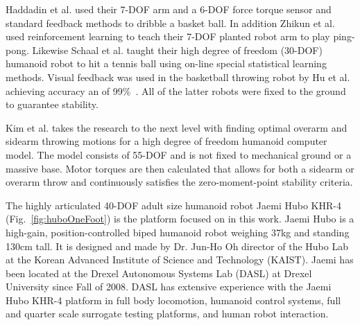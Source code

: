 Haddadin et al.\cite{6094757} used their 7-DOF arm and a 6-DOF force torque sensor and standard feedback methods to dribble a basket ball.  In addition Zhikun et al.\cite{6094892} used reinforcement learning to teach their 7-DOF planted robot arm to play ping-pong.  Likewise Schaal et al.\cite{schaal01/BIRG} taught their high degree of freedom (30-DOF) humanoid robot to hit a tennis ball using on-line special statistical learning methods.  Visual feedback was used in the basketball throwing robot by Hu et al. achieving accuracy an of 99\%~\cite{5649335}.  All of the latter robots were fixed to the ground to guarantee stability.

Kim et al. \cite{5686315,JooH2011438} takes the research to the next level with finding optimal overarm and sidearm throwing motions for a high degree of freedom humanoid computer model.  The model consists of 55-DOF and is not fixed to mechanical ground or a massive base.  Motor torques are then calculated that allows for both a sidearm or overarm throw and continuously satisfies the zero-moment-point stability criteria\cite{4309277}.  

The highly articulated 40-DOF adult size humanoid robot Jaemi Hubo KHR-4 (Fig.~\ref{fig:huboOneFoot}) is the platform focused on in this work.  Jaemi Hubo is a high-gain, position-controlled biped humanoid robot weighing 37kg and standing 130cm tall.  It is designed and made by Dr. Jun-Ho Oh director of the Hubo Lab at the Korean Advanced Institute of Science and Technology (KAIST).  Jaemi has been located at the Drexel Autonomous Systems Lab (DASL) at Drexel University since Fall of 2008.  DASL has extensive experience with the Jaemi Hubo KHR-4 platform in full body locomotion\cite{5686276}, humanoid control systems\cite{5686325}, full and quarter scale surrogate testing platforms\cite{5379582}, and human robot interaction\cite{5686847,6094987,5928689}.


